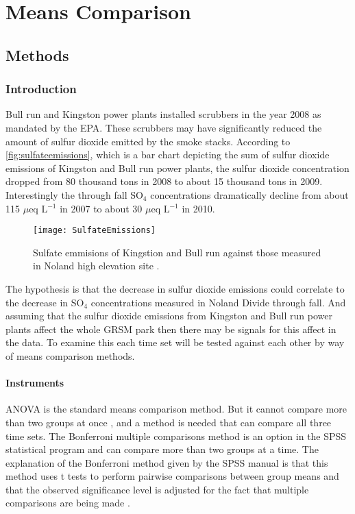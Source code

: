 \chapter{Means Comparison}\label{ch:mc}

\section{Methods}

\subsection{Introduction}
Bull run and Kingston power plants installed scrubbers in the year 2008 as mandated by the EPA.
These scrubbers may have significantly reduced the amount of sulfur dioxide emitted by the smoke stacks.
According to \autoref{fig:sulfateemissions}, which is a bar chart depicting the sum of sulfur dioxide emissions of Kingston and Bull run power plants,  the sulfur dioxide concentration dropped from 80 thousand tons in 2008 to about 15 thousand tons in 2009.
Interestingly the through fall SO$_4$ concentrations dramatically decline from about 115 $\mu$eq L$^{-1}$ in 2007 to about 30 $\mu$eq L$^{-1}$ in 2010.
\begin{figure}[h!]
  \centering
  \texttt{[image: SulfateEmissions]}\\
  \caption{Sulfate emmisions of Kingstion and Bull run against those measured in Noland high elevation site \citep{annualreport2012}.}\label{fig:sulfateemissions}
\end{figure}
The hypothesis is that the decrease in sulfur dioxide emissions could correlate to the decrease in SO$_4$ concentrations measured in Noland Divide through fall.
And assuming that the sulfur dioxide emissions from Kingston and Bull run power plants affect the whole GRSM park then there may be signals for this affect in the data.
To examine this each time set will be tested against each other by way of means comparison methods.

\subsubsection{Instruments}
ANOVA is the standard means comparison method.
But it cannot compare more than two groups at once , and a method is needed that can compare all three time sets.
The Bonferroni multiple comparisons method is an option in the SPSS statistical program and can compare more than two groups at a time.
The explanation of the Bonferroni method given by the SPSS manual is that this method uses t tests to perform pairwise comparisons between group means and that the observed significance level is adjusted for the fact that multiple comparisons are being made \citep{spss}.

